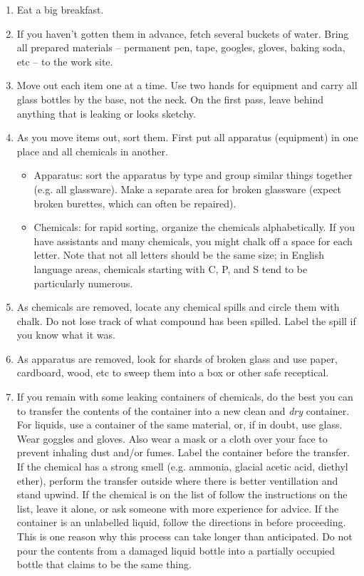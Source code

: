\begin{enumerate}
\item{Eat a big breakfast.}
\item{If you haven't gotten them in advance, fetch several buckets of water. Bring all prepared materials -- permanent pen, tape, googles, gloves, baking soda, etc -- to the work site.}
\item{Move out each item one at a time. Use two hands for equipment and carry all glass bottles by the base, not the neck. On the first pass, leave behind anything that is leaking or looks sketchy.}
\item{As you move items out, sort them. First put all apparatus (equipment) in one place and all chemicals in another.
\begin{itemize}
\item{Apparatus: sort the apparatus by type and group similar things together (e.g. all glassware). Make a separate area for broken glassware (expect broken burettes, which can often be repaired).}
\item{Chemicals: for rapid sorting, organize the chemicals alphabetically. If you have assistants and many chemicals, you might chalk off a space for each letter. Note that not all letters should be the same size; in English language areas, chemicals starting with C, P, and S tend to be particularly numerous.}
\end{itemize}
}
\item{As chemicals are removed, locate any chemical spills and circle them with chalk. Do not lose track of what compound has been spilled. Label the spill if you know what it was.}
\item{As apparatus are removed, look for shards of broken glass and use paper, cardboard, wood, etc to sweep them into a box or other safe receptical.}
\item{If you remain with some leaking containers of chemicals, do the best you can to transfer the contents of the container into a new clean and \textit{dry} container. For liquids, use a container of the same material, or, if in doubt, use glass. Wear goggles and gloves. Also wear a mask or a cloth over your face to prevent inhaling dust and/or fumes. Label the container before the transfer. If the chemical has a strong smell (e.g. ammonia, glacial acetic acid, diethyl ether), perform the transfer outside where there is better ventillation and stand upwind. If the chemical is on the list of  follow the instructions on the list, leave it alone, or ask someone with more experience for advice. If the container is an unlabelled liquid, follow the directions in  before proceeding. This is one reason why this process can take longer than anticipated. Do not pour the contents from a damaged liquid bottle into a partially occupied bottle that claims to be the same thing.}

\end{enumerate}
